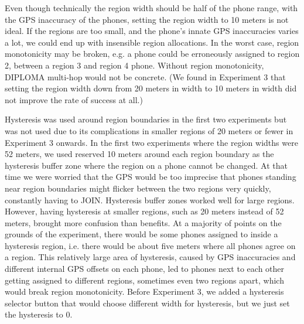 Even though technically the region width should be half of the phone range, with the GPS inaccuracy of the phones, setting the region width to 10 meters is not ideal. If the regions are too small, and the phone's innate GPS inaccuracies varies a lot, we could end up with insensible region allocations. In the worst case, region monotonicity may be broken, e.g. a phone could be erroneously assigned to region 2, between a region 3 and region 4 phone. Without region monotonicity, DIPLOMA multi-hop would not be concrete. (We found in Experiment 3 that setting the region width down from 20 meters in width to 10 meters in width did not improve the rate of success at all.)

Hysteresis was used around region boundaries in the first two experiments but was not used due to its complications in smaller regions of 20 meters or fewer in Experiment 3 onwards. In the first two experiments where the region widths were 52 meters, we used reserved 10 meters around each region boundary as the hysteresis buffer zone where the region on a phone cannot be changed. At that time we were worried that the GPS would be too imprecise that phones standing near region boundaries might flicker between the two regions very quickly, constantly having to JOIN. Hysteresis buffer zones worked well for large regions. However, having hysteresis at smaller regions, such as 20 meters instead of 52 meters, brought more confusion than benefits. At a majority of points on the grounds of the experiment, there would be some phones assigned to inside a hysteresis region, i.e. there would be about five meters where all phones agree on a region. This relatively large area of hysteresis, caused by GPS inaccuracies and different internal GPS offsets on each phone, led to phones next to each other getting assigned to different regions, sometimes even two regions apart, which would break region monotonicity. Before Experiment 3, we added a hysteresis selector button that would choose different width for hysteresis, but we just set the hysteresis to 0.



